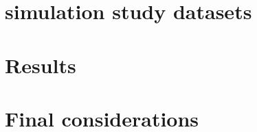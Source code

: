 \documentclass[12pt, %
               openright, %
               oneside, %
               a4paper, %
               chapter=TITLE, %
               section=TITLE, %
               brazil,
               english %
]{abntex2}
\begin{document}
\chapter{simulation study datasets}
\label{cap:datasets}

\chapter{Results}
\label{cap:results}

\chapter{Final considerations}
\label{cap:finalc}

\setlength{\afterchapskip}{\baselineskip}

\postextual
\end{document}
